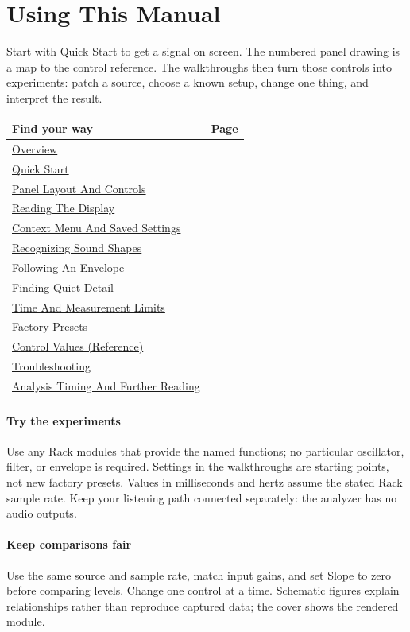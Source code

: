 \section*{Using This Manual}
Start with Quick Start to get a signal on screen. The numbered panel drawing
is a map to the control reference. The walkthroughs then turn those controls
into experiments: patch a source, choose a known setup, change one thing,
and interpret the result.

\begin{center}
\renewcommand{\arraystretch}{1.3}
\begin{tabularx}{\textwidth}{@{}Xr@{}}
\toprule
\textbf{Find your way} & \textbf{Page} \\
\midrule
\hyperref[sec:overview]{Overview} & \pageref{sec:overview} \\
\hyperref[sec:quick-start]{Quick Start} & \pageref{sec:quick-start} \\
\hyperref[sec:panel]{Panel Layout And Controls} & \pageref{sec:panel} \\
\hyperref[sec:display]{Reading The Display} & \pageref{sec:display} \\
\hyperref[sec:settings]{Context Menu And Saved Settings} & \pageref{sec:settings} \\
\hyperref[sec:shapes]{Recognizing Sound Shapes} & \pageref{sec:shapes} \\
\hyperref[sec:envelope]{Following An Envelope} & \pageref{sec:envelope} \\
\hyperref[sec:detail]{Finding Quiet Detail} & \pageref{sec:detail} \\
\hyperref[sec:time]{Time And Measurement Limits} & \pageref{sec:time} \\
\hyperref[sec:presets]{Factory Presets} & \pageref{sec:presets} \\
\hyperref[sec:control-values]{Control Values (Reference)} & \pageref{sec:control-values} \\
\hyperref[sec:troubleshooting]{Troubleshooting} & \pageref{sec:troubleshooting} \\
\hyperref[sec:further-reading]{Analysis Timing And Further Reading} & \pageref{sec:further-reading} \\
\bottomrule
\end{tabularx}
\end{center}

\paragraph{Try the experiments}
Use any Rack modules that provide the named functions; no particular
oscillator, filter, or envelope is required. Settings in the walkthroughs
are starting points, not new factory presets. Values in milliseconds and
hertz assume the stated Rack sample rate. Keep your listening path connected
separately: the analyzer has no audio outputs.

\paragraph{Keep comparisons fair}
Use the same source and sample rate, match input gains, and set Slope to zero
before comparing levels. Change one control at a time. Schematic figures
explain relationships rather than reproduce captured data; the cover shows
the rendered module.
